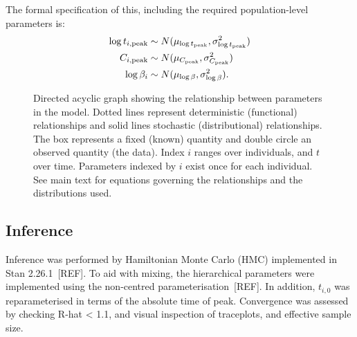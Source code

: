 \documentclass[thesis.tex]{subfiles}
\begin{document}
The formal specification of this, including the required population-level parameters is:
\begin{align}
    \log t_{i,\text{peak}} &\sim N(\mu_{\log t_\text{peak}}, \sigma_{\log t_\text{peak}}^2) 
    \label{eq:paper:tpeak}\\
    C_{i,\text{peak}} &\sim N(\mu_{C_\text{peak}}, \sigma_{C_\text{peak}}^2) 
    \label{eq:paper:Cpeak}\\
    \log \beta_i &\sim N(\mu_{\log \beta}, \sigma_{\log \beta}^2).
    \label{eq:paper:beta}
\end{align}

\begin{figure}
    \centering
    \caption{Directed acyclic graph showing the relationship between parameters in the model. Dotted lines represent deterministic (functional) relationships and solid lines stochastic (distributional) relationships. The box represents a fixed (known) quantity and double circle an observed quantity (the data). Index $i$ ranges over individuals, and $t$ over time. Parameters indexed by $i$ exist once for each individual. See main text for equations governing the relationships and the distributions used.}
    \label{fig:paper:model_DAG}
\end{figure}

\subsection{Inference}

Inference was performed by Hamiltonian Monte Carlo (HMC) implemented in Stan 2.26.1~[REF].
To aid with mixing, the hierarchical parameters were implemented using the non-centred parameterisation~[REF].
In addition, $t_{i,0}$ was reparameterised in terms of the absolute time of peak.
Convergence was assessed by checking R-hat < 1.1, and visual inspection of traceplots, and effective sample size.
\end{document}
